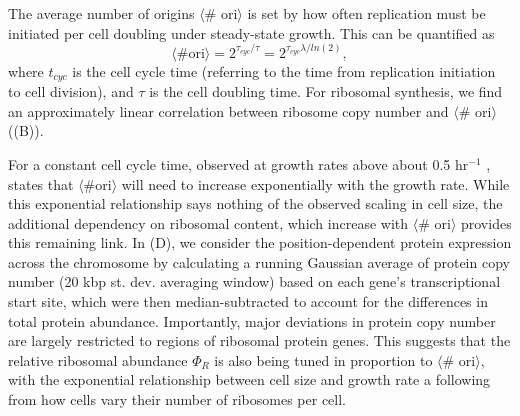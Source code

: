 The average number of origins $\langle$\# ori$\rangle$ is set by how often
replication must be initiated per cell doubling under steady-state growth.
This can be quantified as
\begin{equation}
    \langle \text{\# ori} \rangle = 2^{\tau_{cyc} / \tau} = 2^{\tau_{cyc} \lambda / ln(2)},
    \label{eq:Nori}
\end{equation}
where $t_{cyc}$ is the cell cycle time (referring to the time from replication
initiation to cell division), and $\tau$ is the cell doubling time. For
ribosomal synthesis, we find an approximately linear correlation between
ribosome copy number and $\langle$\# ori$\rangle$
((B)).

For a constant cell cycle time, observed at growth rates above about 0.5
hr$^{-1}$ \citep{helmstetter1968},  states that $\langle \text{\# ori}
\rangle$ will need to increase exponentially with the growth rate. While this
exponential relationship says nothing of the observed scaling in cell size, the
additional dependency on ribosomal content, which increase with $\langle$\#
ori$\rangle$ provides this remaining link.  In (D),
we consider the position-dependent protein expression across the chromosome by
calculating a running Gaussian average of protein copy number (20 kbp st. dev.
averaging window) based on each gene's transcriptional start site, which were
then median-subtracted to account for the differences in total protein
abundance. Importantly, major deviations in protein copy number are largely
restricted to regions of ribosomal protein genes. This suggests that the
relative ribosomal abundance $\Phi_R$ is also being tuned in proportion to
$\langle$\# ori$\rangle$, with the exponential relationship between  cell size
and growth rate a following from how cells vary their number of ribosomes per
cell.


